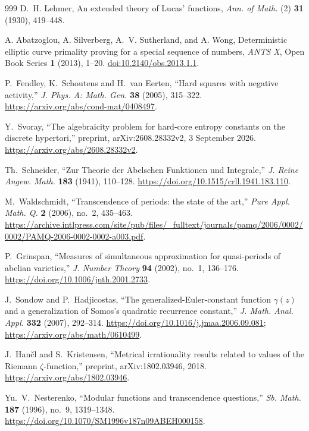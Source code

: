 \documentclass[11pt,a4paper]{article}
\theoremstyle{definition}
\theoremstyle{remark}
\numberwithin{equation}{section}
\begin{document}
\begin{thebibliography}{999}
D.~H. Lehmer,
An extended theory of Lucas' functions,
\emph{Ann. of Math.} (2) \textbf{31} (1930), 419--448.

A. Abatzoglou, A. Silverberg, A.~V. Sutherland, and A. Wong,
Deterministic elliptic curve primality proving for a special sequence
of numbers,
\emph{ANTS X}, Open Book Series \textbf{1} (2013), 1--20.
\href{https://doi.org/10.2140/obs.2013.1.1}
{doi:10.2140/obs.2013.1.1}.

P.~Fendley, K.~Schoutens and H.~van Eerten,
``Hard squares with negative activity,''
\emph{J. Phys. A: Math. Gen.} \textbf{38} (2005), 315--322.
\url{https://arxiv.org/abs/cond-mat/0408497}.

Y.~Svoray, ``The algebraicity problem for hard-core entropy constants on
the discrete hypertori,'' preprint, arXiv:2608.28332v2, 3 September 2026.
\url{https://arxiv.org/abs/2608.28332v2}.

Th.~Schneider, ``Zur Theorie der Abelschen Funktionen und Integrale,''
\emph{J. Reine Angew. Math.} \textbf{183} (1941), 110--128.
\url{https://doi.org/10.1515/crll.1941.183.110}.

M.~Waldschmidt, ``Transcendence of periods: the state of the art,''
\emph{Pure Appl. Math. Q.} \textbf{2} (2006), no.~2, 435--463.
\url{https://archive.intlpress.com/site/pub/files/_fulltext/journals/pamq/2006/0002/0002/PAMQ-2006-0002-0002-a003.pdf}.

P.~Grinspan, ``Measures of simultaneous approximation for quasi-periods
of abelian varieties,'' \emph{J. Number Theory} \textbf{94} (2002),
no.~1, 136--176.
\url{https://doi.org/10.1006/jnth.2001.2733}.

J.~Sondow and P.~Hadjicostas, ``The generalized-Euler-constant function
$\gamma(z)$ and a generalization of Somos's quadratic recurrence constant,''
\emph{J. Math. Anal. Appl.} \textbf{332} (2007), 292--314.
\url{https://doi.org/10.1016/j.jmaa.2006.09.081};
\url{https://arxiv.org/abs/math/0610499}.

J.~Han\v{c}l and S.~Kristensen, ``Metrical irrationality results related
to values of the Riemann $\zeta$-function,'' preprint, arXiv:1802.03946,
2018. \url{https://arxiv.org/abs/1802.03946}.

Yu.~V.~Nesterenko, ``Modular functions and transcendence questions,''
\emph{Sb. Math.} \textbf{187} (1996), no.~9, 1319--1348.
\url{https://doi.org/10.1070/SM1996v187n09ABEH000158}.


\end{thebibliography}
\end{document}
